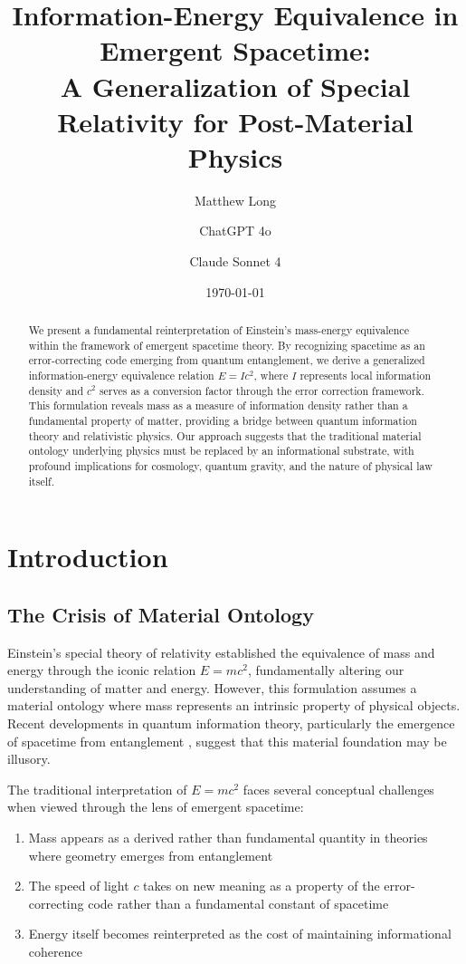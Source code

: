 \documentclass[12pt]{article}
\title{Information-Energy Equivalence in Emergent Spacetime: \\
A Generalization of Special Relativity for Post-Material Physics}
\author[1]{Matthew Long}
\author[2]{ChatGPT 4o}
\author[3]{Claude Sonnet 4}
\affil[1]{Yoneda AI}
\affil[2]{OpenAI}
\affil[3]{Anthropic}
\date{\today}
\begin{document}
\maketitle

\begin{abstract}
We present a fundamental reinterpretation of Einstein's mass-energy equivalence within the framework of emergent spacetime theory. By recognizing spacetime as an error-correcting code emerging from quantum entanglement, we derive a generalized information-energy equivalence relation $E = Ic^2$, where $I$ represents local information density and $c^2$ serves as a conversion factor through the error correction framework. This formulation reveals mass as a measure of information density rather than a fundamental property of matter, providing a bridge between quantum information theory and relativistic physics. Our approach suggests that the traditional material ontology underlying physics must be replaced by an informational substrate, with profound implications for cosmology, quantum gravity, and the nature of physical law itself.
\end{abstract}

\onehalfspacing

\tableofcontents

\newpage

\section{Introduction}

\subsection{The Crisis of Material Ontology}

Einstein's special theory of relativity established the equivalence of mass and energy through the iconic relation $E = mc^2$, fundamentally altering our understanding of matter and energy. However, this formulation assumes a material ontology where mass represents an intrinsic property of physical objects. Recent developments in quantum information theory, particularly the emergence of spacetime from entanglement \cite{VanRaamsdonk2010, Ryu2006}, suggest that this material foundation may be illusory.

The traditional interpretation of $E = mc^2$ faces several conceptual challenges when viewed through the lens of emergent spacetime:
\begin{enumerate}
\item Mass appears as a derived rather than fundamental quantity in theories where geometry emerges from entanglement
\item The speed of light $c$ takes on new meaning as a property of the error-correcting code rather than a fundamental constant of spacetime
\item Energy itself becomes reinterpreted as the cost of maintaining informational coherence
\end{enumerate}
\end{document}
